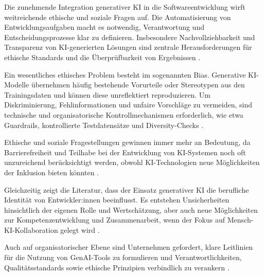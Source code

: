 
Die zunehmende Integration generativer KI in die Softwareentwicklung wirft
weitreichende ethische und soziale Fragen auf. Die Automatisierung von
Entwicklungsaufgaben macht es notwendig, Verantwortung und
Entscheidungsprozesse klar zu definieren. Insbesondere Nachvollziehbarkeit und
Transparenz von KI-generierten Lösungen sind zentrale Herausforderungen für
ethische Standards und die Überprüfbarkeit von Ergebnissen
\cite{weisz_design_2024}.

Ein wesentliches ethisches Problem besteht im sogenannten Bias. Generative
KI-Modelle übernehmen häufig bestehende Vorurteile oder Stereotypen aus den
Trainingsdaten und können diese unreflektiert reproduzieren. Um
Diskriminierung, Fehlinformationen und unfaire Vorschläge zu vermeiden, sind
technische und organisatorische Kontrollmechanismen erforderlich, wie etwa
Guardrails, kontrollierte Testdatensätze und Diversity-Checks
\cite{weisz_design_2024, schmitt_generative_2024}.

Ethische und soziale Fragestellungen gewinnen immer mehr an Bedeutung, da
Barrierefreiheit und Teilhabe bei der Entwicklung von KI-Systemen noch oft
unzureichend berücksichtigt werden, obwohl KI-Technologien neue Möglichkeiten
der Inklusion bieten könnten \cite{flores-saviaga_impact_2025}.

Gleichzeitig zeigt die Literatur, dass der Einsatz generativer KI die
berufliche Identität von Entwickler:innen beeinflusst. Es entstehen
Unsicherheiten hinsichtlich der eigenen Rolle und Wertschätzung, aber auch neue
Möglichkeiten zur Kompetenzentwicklung und Zusammenarbeit, wenn der Fokus auf
Mensch-KI-Kollaboration gelegt wird \cite{schmitt_generative_2024}.

Auch auf organisatorischer Ebene sind Unternehmen gefordert, klare Leitlinien
für die Nutzung von GenAI-Tools zu formulieren und Verantwortlichkeiten,
Qualitätsstandards sowie ethische Prinzipien verbindlich zu verankern
\cite{nguyen-duc_generative_2023}.
